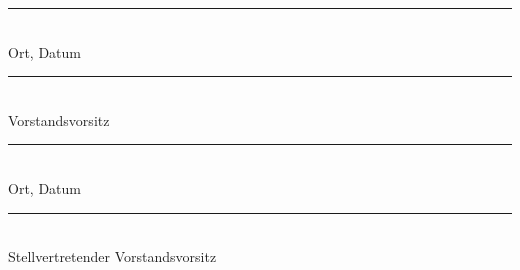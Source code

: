 \documentclass[a4paper, fontsize=11pt]{scrartcl}
\begin{document}
\vspace{1.8cm}
\noindent\begin{minipage}[t]{0.33\textwidth}
\rule{\linewidth}{0.4pt}\\
\small Ort, Datum
\end{minipage}\hfill
\begin{minipage}[t]{0.62\textwidth}
\rule{\linewidth}{0.4pt}\\
\small Vorstandsvorsitz
\end{minipage}

\vspace{1.8cm}
\noindent\begin{minipage}[t]{0.33\textwidth}
\rule{\linewidth}{0.4pt}\\
\small Ort, Datum
\end{minipage}\hfill
\begin{minipage}[t]{0.62\textwidth}
\rule{\linewidth}{0.4pt}\\
\small Stellvertretender Vorstandsvorsitz
\end{minipage}

\vspace{0.5em}


\clearpage
\end{document}
